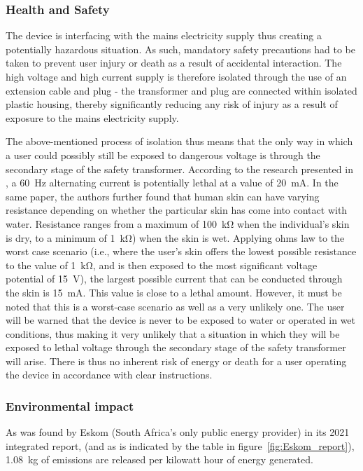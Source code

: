 \subsubsection{Health and Safety}               
The device is interfacing with the mains electricity supply thus creating a potentially hazardous situation. As such, mandatory safety precautions had to be taken to prevent user injury or death as a result of accidental interaction. The high voltage and high current supply is therefore isolated through the use of an extension cable and plug - the transformer and plug are connected within isolated plastic housing, thereby significantly reducing any risk of injury as a result of exposure to the mains electricity supply.
\par
The above-mentioned process of isolation thus means that the only way in which a user could possibly still be exposed to dangerous voltage is through the secondary stage of the safety transformer. According to the research presented in \cite{Fish2009-ce}, a \qty{60}{\hertz} alternating current is potentially lethal at a value of \qty{20}{\mA}. In the same paper, the authors further found that human skin can have varying resistance depending on whether the particular skin has come into contact with water. Resistance ranges from a maximum of \qty{100}{\kohm} when the individual's skin is dry, to a minimum of \qty{1}{\kohm}) when the skin is wet. Applying ohms law to the worst case scenario (i.e., where the user's skin offers the lowest possible resistance to the value of \qty{1}{\kohm}, and is then exposed to the most significant voltage potential of \qty{15}{\volt}), the largest possible current that can be conducted through the skin is \qty{15}{\mA}. This value is close to a lethal amount. However, it must be noted that this is a worst-case scenario as well as a very unlikely one. The user will be warned that the device is never to be exposed to water or operated in wet conditions, thus making it very unlikely that a situation in which they will be exposed to lethal voltage through the secondary stage of the safety transformer will arise. There is thus no inherent risk of energy or death for a user operating the device in accordance with clear instructions.
\subsubsection{Environmental impact}

As was found by Eskom (South Africa's only public energy provider) in its 2021 integrated report, (and as is indicated by the table in figure~\ref{fig:Eskom_report}), \qty{1.08}{\kilogram} of  emissions are released per kilowatt hour of energy generated. 

